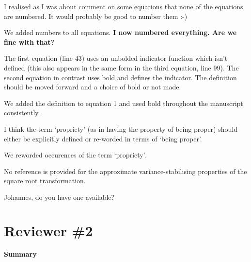 \documentclass{article}
\newcommand{\red}{\color{red}}
\newcommand{\black}{\color{black}}
\newcommand{\blue}{\color{blue}}
\begin{document}
I realised as I was about comment on some equations that none of the equations are numbered. It would probably be good to number them :-)

\black
We added numbers to all equations. 
\textbf{I now numbered everything. Are we fine with that?}

\blue
The first equation (line 43) uses an unbolded indicator function which isn’t defined (this also appears in the same form in the third equation, line 99). The second equation in contrast uses bold and defines the indicator. The definition should be moved forward and a choice of bold or not made.

\black
We added the definition to equation 1 and used bold throughout the manuscript consistently. 

\blue
I think the term ‘propriety’ (as in having the property of being proper) should either be explicitly defined or re-worded in terms of ‘being proper’.

\black
We reworded occurences of the term `propriety'. 

\red
No reference is provided for the approximate variance-stabilising properties of the square root transformation.

\black
Johannes, do you have one available? 










\red
\section{Reviewer \#2}

\textbf{Summary}
\end{document}
